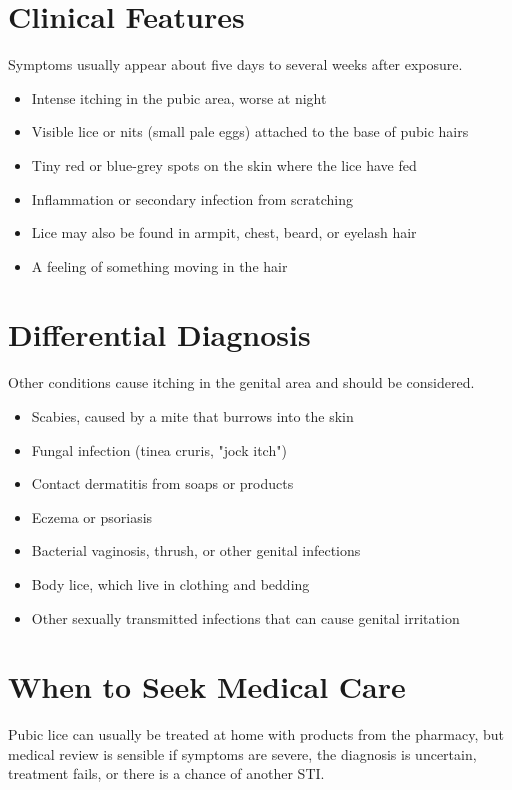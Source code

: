 \section*{Clinical Features}
Symptoms usually appear about five days to several weeks after exposure.

\begin{itemize}
    \item Intense itching in the pubic area, worse at night
    \item Visible lice or nits (small pale eggs) attached to the base of pubic hairs
    \item Tiny red or blue-grey spots on the skin where the lice have fed
    \item Inflammation or secondary infection from scratching
    \item Lice may also be found in armpit, chest, beard, or eyelash hair
    \item A feeling of something moving in the hair
\end{itemize}

\section*{Differential Diagnosis}
Other conditions cause itching in the genital area and should be considered.

\begin{itemize}
    \item Scabies, caused by a mite that burrows into the skin
    \item Fungal infection (tinea cruris, "jock itch")
    \item Contact dermatitis from soaps or products
    \item Eczema or psoriasis
    \item Bacterial vaginosis, thrush, or other genital infections
    \item Body lice, which live in clothing and bedding
    \item Other sexually transmitted infections that can cause genital irritation
\end{itemize}

\section*{When to Seek Medical Care}
Pubic lice can usually be treated at home with products from the pharmacy, but medical review is sensible if symptoms are severe, the diagnosis is uncertain, treatment fails, or there is a chance of another STI.

